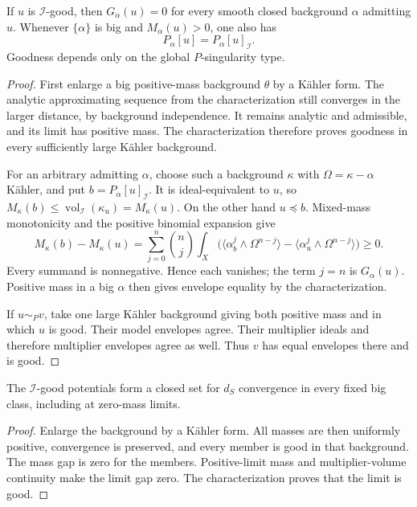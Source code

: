 \begin{proposition}\label{prop:i-good-background-independence}
If $u$ is $\mathcal I$-good, then $G_\alpha(u)=0$ for every smooth closed background $\alpha$ admitting $u$. Whenever $\{\alpha\}$ is big and $M_\alpha(u)>0$, one also has
\[
 P_\alpha[u]=P_\alpha[u]_{\mathcal I}.
\]
Goodness depends only on the global $P$-singularity type.
\end{proposition}
\begin{proof}
First enlarge a big positive-mass background $\theta$ by a K\"ahler form. The analytic approximating sequence from the characterization still converges in the larger distance, by background independence. It remains analytic and admissible, and its limit has positive mass. The characterization therefore proves goodness in every sufficiently large K\"ahler background.

For an arbitrary admitting $\alpha$, choose such a background $\kappa$ with $\Omega=\kappa-\alpha$ K\"ahler, and put $b=P_\alpha[u]_{\mathcal I}$. It is ideal-equivalent to $u$, so
$M_\kappa(b)\leq\operatorname{vol}_{\mathcal I}(\kappa_u)=M_\kappa(u)$.
On the other hand $u\preceq b$. Mixed-mass monotonicity and the positive binomial expansion give
\[
 M_\kappa(b)-M_\kappa(u)
   =\sum_{j=0}^n\binom nj\int_X
       \bigl(\langle\alpha_b^j\wedge\Omega^{n-j}\rangle
                -\langle\alpha_u^j\wedge\Omega^{n-j}\rangle\bigr)\geq0.
\]
Every summand is nonnegative. Hence each vanishes; the term $j=n$ is $G_\alpha(u)$. Positive mass in a big $\alpha$ then gives envelope equality by the characterization.

If $u\sim_Pv$, take one large K\"ahler background giving both positive mass and in which $u$ is good. Their model envelopes agree. Their multiplier ideals and therefore multiplier envelopes agree as well. Thus $v$ has equal envelopes there and is good.
\end{proof}

\begin{corollary}\label{cor:i-good-singularity-closedness}
The $\mathcal I$-good potentials form a closed set for $d_S$ convergence in every fixed big class, including at zero-mass limits.
\end{corollary}
\begin{proof}
Enlarge the background by a K\"ahler form. All masses are then uniformly positive, convergence is preserved, and every member is good in that background. The mass gap is zero for the members. Positive-limit mass and multiplier-volume continuity make the limit gap zero. The characterization proves that the limit is good.
\end{proof}

